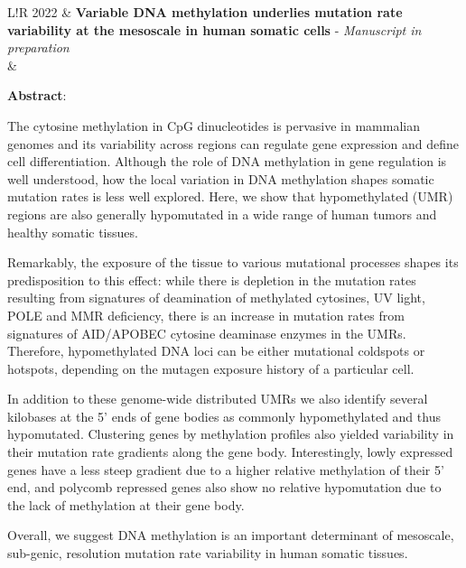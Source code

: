 \documentclass[10pt,a4paper]{article} %
\newcommand\VRule{\color{lightgray}\vrule width 0.5pt}
\begin{document}
\begin{tabular}{L!{\VRule}R}
2022 & \textbf{Variable DNA methylation underlies mutation rate variability at the mesoscale in human somatic cells} -  {\em \color{black!70} Manuscript in preparation}   \\
& 

\bigskip

\textbf{Abstract}:



The cytosine methylation in CpG dinucleotides is pervasive in mammalian genomes and its variability across regions can regulate gene expression and define cell differentiation. Although the role of DNA methylation in gene regulation is well understood, how the local variation in DNA methylation shapes somatic mutation rates is less well explored. Here, we show that hypomethylated (UMR) regions are also generally hypomutated in a wide range of human tumors and healthy somatic tissues.

\medskip

Remarkably, the exposure of the tissue to various mutational processes shapes its predisposition to this effect: while there is depletion in the mutation rates resulting from signatures of deamination of methylated cytosines, UV light, POLE and MMR deficiency, there is an increase in mutation rates from signatures of AID/APOBEC cytosine deaminase enzymes in the UMRs. Therefore, hypomethylated DNA loci can be either mutational coldspots or hotspots, depending on the mutagen exposure history of a particular cell.

\medskip

In addition to these genome-wide distributed UMRs we also identify several kilobases at the 5’ ends of gene bodies as commonly hypomethylated and thus hypomutated. Clustering genes by methylation profiles also yielded variability in their mutation rate gradients along the gene body. Interestingly, lowly expressed genes have a less steep gradient due to a higher relative methylation of their 5’ end, and polycomb repressed genes also show no relative hypomutation due to the lack of methylation at their gene body.


\medskip


Overall, we suggest DNA methylation is an important determinant of mesoscale, sub-genic, resolution mutation rate variability in human somatic tissues.


\end{tabular}
\end{document}
